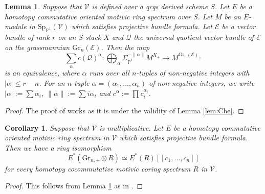 \documentclass{amsart}
\theoremstyle{plain}
\newtheorem{lemma}[theorem]{Lemma}
\newtheorem{corollary}[theorem]{Corollary}
\theoremstyle{definition}
\theoremstyle{remark}
\numberwithin{equation}{theorem}
\newcommand{\mcal}[1]{\mathcal{#1}}
\newcommand{\Gr}{\mathrm{Gr}}
\newcommand{\V}{\mathcal{V}}
\newcommand{\SigmaP}{\Sigma_{\mathbb{P}^1}}
\newcommand{\SpP}{\mathrm{Sp}_{\mathbb{P}^1}}
\begin{document}
\begin{lemma}\label{lem:Che2}
Suppose that $\V$ is defined over a qcqs derived scheme $S$.
Let $E$ be a homotopy commutative oriented motivic ring spectrum over $S$.
Let $M$ be an $E$-module in $\SpP(\V)$ which satisfies projective bundle formula.
Let $\mcal{E}$ be a vector bundle of rank $r$ on an $S$-stack $X$ and $\mcal{Q}$ the universal quotient vector bundle of $\mcal{E}$ on the grassmannian $\Gr_n(\mcal{E})$.
Then the map
\[
	\sum_\alpha c(\mcal{Q})^\alpha \colon \bigoplus_\alpha \SigmaP^{-\lVert\alpha\rVert}M^{X_+} \to M^{\Gr_n(\mcal{E})_+}
\]
is an equivalence, where $\alpha$ runs over all $n$-tuples of non-negative integers with $|\alpha|\le r-n$.
For an $n$-tuple $\alpha=(\alpha_1,\dotsc,\alpha_n)$ of non-negative integers, we write $|\alpha|:=\sum\alpha_i$, $\lVert\alpha\rVert:=\sum i\alpha_i$ and $c^\alpha:=\prod c_i^{\alpha_i}$.
\end{lemma}
\begin{proof}
The proof of \cite[Lemma 4.5]{AI} works as it is under the validity of Lemma \ref{lem:Che}.
\end{proof}

\begin{corollary}\label{cor:Che}
Suppose that $\V$ is multiplicative.
Let $E$ be a homotopy commutative oriented motivic ring spectrum in $\V$ which satisfies projective bundle formula.
Then we have a ring isomorphism
\[
	E^*(\Gr_{n,+}\otimes R) \simeq E^*(R)[[c_1,\dotsc,c_n]]
\]
for every homotopy cocommutative motivic coring spectrum $R$ in $\V$.
\end{corollary}
\begin{proof}
This follows from Lemma \ref{lem:Che2} as in \cite[Corollary 4.6]{AI}.
\end{proof}
\end{document}
